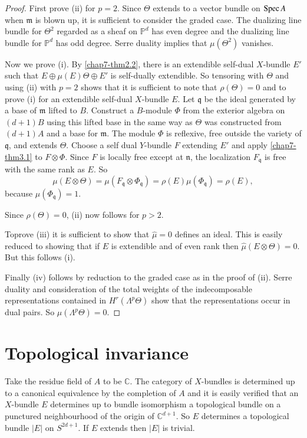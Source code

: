 \begin{proof}
First prove (ii) for $p=2$. Since $\Theta$ extends to a vector bundle
on $\operatorname{Spec} A$ when $\mathfrak{m}$ is blown up, it is sufficient to
consider the graded case. The dualizing line bundle for $\Theta^{2}$
regarded as a sheaf on $\mathbb{P}^{d}$ has even degree and the
dualizing line bundle for $\mathbb{P}^{d}$ has odd degree. Serre
duality implies that $\mu(\Theta^{2})$ vanishes. 

Now we prove (i). By \ref{chap7-thm2.2}, there is an extendible
self-dual $X$-bundle $E'$ such that $E\oplus\mu(E)\Theta\oplus E'$ is
self-dually extendible. So tensoring with $\Theta$ and using (ii) with
$p=2$ shows that it is sufficient to note that $\rho(\Theta)=0$ and to
prove (i) for an extendible self-dual $X$-bundle $E$. Let
$\mathfrak{q}$ be the ideal generated by a base of $\mathfrak{m}$
lifted to $B$. Construct a $B$-module $\Phi$ from the exterior algebra
on $(d+1)B$ using this lifted base in the same way as $\Theta$ was
constructed from $(d+1)A$ and a base for $\mathfrak{m}$. The module
$\Phi$ is reflexive, free outside the variety of $\mathfrak{q}$, and
extends $\Theta$. Choose a self dual $Y$-bundle $F$ extending $E'$ and
apply \ref{chap7-thm3.1} to $F\otimes \Phi$. Since $F$ is locally free
except at $\mathfrak{n}$, the localization $F_{\mathfrak{q}}$ is free
with the same rank as $E$. So
$$
\mu(E\otimes \Theta)=\mu(F_{\mathfrak{q}}\otimes \Phi_{\mathfrak{q}})=\rho(E)\mu(\Phi_{\mathfrak{q}})=\rho(E),
$$
because $\mu(\Phi_{\mathfrak{q}})=1$.

Since $\rho(\Theta)=0$, (ii) now follows for $p>2$.

To\pageoriginale prove (iii) it is sufficient to show that
$\widehat{\mu}=0$ defines an ideal. This is easily reduced to showing
that if $E$ is extendible and of even rank then
$\widehat{\mu}(E\otimes \Theta)=0$. But this follows (i).

Finally (iv)  follows by reduction to the graded case as in the proof
of (ii). Serre duality and consideration of the total weights of the
indecomposable representations contained in $H^{r}(\Lambda^{p}\Theta)$
show that the representations occur in dual pairs. So
$\mu(\Lambda^{p}\Theta)=0$. 
\end{proof}

\section{Topological invariance}\label{chap7-sec5}

Take the residue field of $A$ to be $\mathbb{C}$. The category of
$X$-bundles is determined up to a canonical equivalence by the
completion of $A$ and it is easily verified that an $X$-bundle $E$
determines up to bundle isomorphism a topological bundle on a
punctured neighbourhood of the origin of $\mathbb{C}^{d+1}$. So $E$
determines a topological bundle $|E|$ on $S^{2d+1}$. If $E$ extends
then $|E|$ is trivial. 

